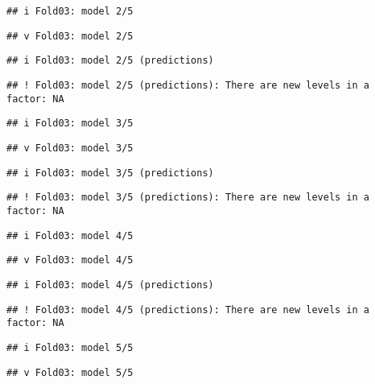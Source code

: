\documentclass[
]{article}
\begin{document}
\begin{verbatim}
## i Fold03: model 2/5
\end{verbatim}

\begin{verbatim}
## v Fold03: model 2/5
\end{verbatim}

\begin{verbatim}
## i Fold03: model 2/5 (predictions)
\end{verbatim}

\begin{verbatim}
## ! Fold03: model 2/5 (predictions): There are new levels in a factor: NA
\end{verbatim}

\begin{verbatim}
## i Fold03: model 3/5
\end{verbatim}

\begin{verbatim}
## v Fold03: model 3/5
\end{verbatim}

\begin{verbatim}
## i Fold03: model 3/5 (predictions)
\end{verbatim}

\begin{verbatim}
## ! Fold03: model 3/5 (predictions): There are new levels in a factor: NA
\end{verbatim}

\begin{verbatim}
## i Fold03: model 4/5
\end{verbatim}

\begin{verbatim}
## v Fold03: model 4/5
\end{verbatim}

\begin{verbatim}
## i Fold03: model 4/5 (predictions)
\end{verbatim}

\begin{verbatim}
## ! Fold03: model 4/5 (predictions): There are new levels in a factor: NA
\end{verbatim}

\begin{verbatim}
## i Fold03: model 5/5
\end{verbatim}

\begin{verbatim}
## v Fold03: model 5/5
\end{verbatim}
\end{document}
